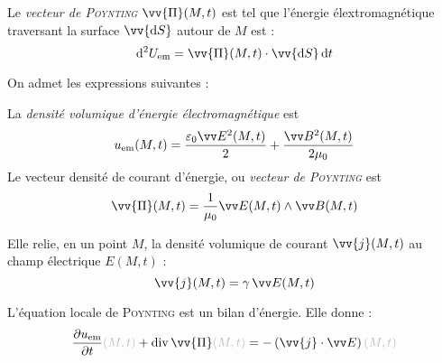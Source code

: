 \documentclass[11pt,a4paper,fleqn,pdftex]{report}
\begin{document}
%
\begin{dfn}
Le \emph{vecteur de \textsc{Poynting}} $\vv{\Pi}(M,t)$ est tel que l'énergie élextromagnétique traversant la surface $\vv{\d S}$ autour de $M$ est :
\begin{equation}
\d^2 U_\text{em} = \vv{\Pi}(M,t)\cdot \vv{\d S}\, \d t
\end{equation}

   On admet les expressions suivantes : \par
   La \emph{densité volumique d'énergie électromagnétique} est 
   \begin{equation}
   u_\text{em}(M,t) = \dfrac{\varepsilon_0 \E^2(M,t)}{2} + \dfrac{\B^2(M,t)}{2\mu_0}
   \end{equation}
   Le vecteur densité de courant d'énergie, ou \emph{vecteur de \textsc{Poynting}} est 
   \begin{equation}
   \vv{\Pi}(M,t) = \frac{1}{\mu_0} \E(M,t) \wedge \B(M,t)
   \end{equation}
\end{dfn}
\begin{itheorem}
Elle relie, en un point $M$, la densité volumique de courant $\vv{j}(M,t)$ au champ électrique $E(M,t)$ :
\begin{equation}\label{OhmLocale}
   \vv{j}(M,t) = \gamma \, \E{}(M,t)
\end{equation}
\end{itheorem} 
\begin{itheorem}
L'équation locale de \textsc{Poynting} est un bilan d'énergie. Elle donne : 
   \begin{equation}
   \dfrac{\partial u_\text{em}}{\partial t}\textcolor{couleurGrisFonce}{(M,t)} + \diverg \vv{\Pi}\textcolor{couleurGrisFonce}{(M,t)} = -\left( \vv{j}\cdot \E \right) \textcolor{couleurGrisFonce}{(M,t)}
   \end{equation}
\end{itheorem}
\end{document}
